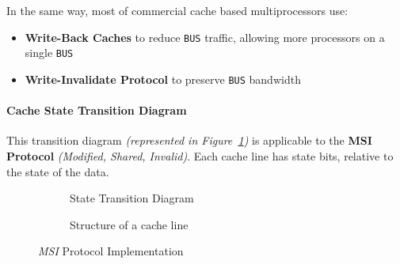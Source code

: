 \documentclass[english]{article}
\begin{document}
In the same way, most of commercial cache based multiprocessors use:

\begin{itemize}
  \item \textbf{Write-Back Caches} to reduce \texttt{BUS} traffic, allowing more processors on a single \texttt{BUS}
  \item \textbf{Write-Invalidate Protocol} to preserve \texttt{BUS} bandwidth
\end{itemize}

\paragraph{Cache State Transition Diagram}

This transition diagram \textit{(represented in Figure~\ref{subfig:MSI-state-transition-diagram})} is applicable to the \textbf{MSI Protocol} \textit{(Modified, Shared, Invalid)}.
Each cache line has state bits, relative to the state of the data.

\begin{figure}[htbp]
  \bigskip
  \centering
  \begin{subfigure}[]{\textwidth}
    \centering

    \caption{State Transition Diagram}
    \label{subfig:MSI-state-transition-diagram}
    \bigskip
  \end{subfigure}
  \begin{subfigure}[]{\textwidth}
    \centering
    \caption{Structure of a cache line}
    \label{subfig:MSI-cache-line}
  \end{subfigure}
  \caption{\textit{MSI} Protocol Implementation}
  \label{fig:MSI-protocol}
\end{figure}
\end{document}
